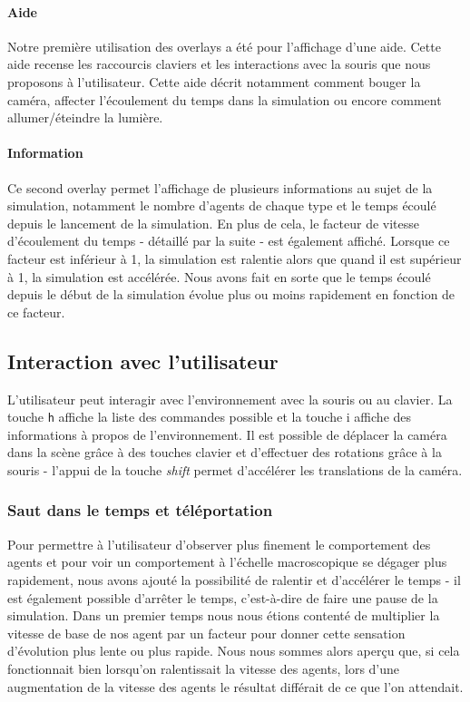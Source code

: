 \paragraph{Aide}
Notre première utilisation des overlays a été pour l'affichage d'une aide.
Cette aide recense les raccourcis claviers et les interactions avec la souris
que nous proposons à l'utilisateur. Cette aide décrit notamment comment bouger
la caméra, affecter l'écoulement du temps dans la simulation ou encore comment
allumer/éteindre la lumière.

\paragraph{Information}
Ce second overlay permet l'affichage de plusieurs informations au sujet de la
simulation, notamment le nombre d'agents de chaque type et le temps écoulé
depuis le lancement de la simulation.
En plus de cela, le facteur de vitesse d'écoulement du temps - détaillé par la
suite - est également affiché. Lorsque ce facteur est inférieur à 1, la
simulation est ralentie alors que quand il est supérieur à 1, la simulation
est accélérée. Nous avons fait en sorte que le temps écoulé depuis le début de
la simulation évolue plus ou moins rapidement en fonction de ce facteur.

\subsection{Interaction avec l'utilisateur}

L'utilisateur peut interagir avec l'environnement avec la souris ou au
clavier. La touche \verb!h! affiche la liste des commandes possible et la
touche i affiche des informations à propos de l'environnement.
Il est possible de déplacer la caméra dans la scène grâce à des touches
clavier et d'effectuer des rotations grâce à la souris - l'appui de la touche
\emph{shift} permet d'accélérer les translations de la caméra.

\subsubsection{Saut dans le temps et téléportation}
Pour permettre à l'utilisateur d'observer plus finement le comportement des
agents et pour voir un comportement à l'échelle macroscopique se dégager plus
rapidement, nous avons ajouté la possibilité de ralentir et d'accélérer le
temps - il est également possible d'arrêter le temps, c'est-à-dire de faire
une pause de la simulation. Dans un premier temps nous nous étions contenté de
multiplier la vitesse de base de nos agent par un facteur pour donner cette
sensation d'évolution plus lente ou plus rapide. Nous nous sommes alors aperçu
que, si cela fonctionnait bien lorsqu'on ralentissait la vitesse des agents,
lors d'une augmentation de la vitesse des agents le résultat différait de ce
que l'on attendait.

